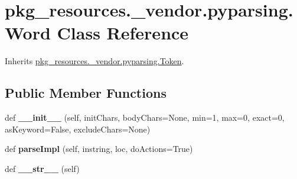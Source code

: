 \hypertarget{classpkg__resources_1_1__vendor_1_1pyparsing_1_1_word}{}\section{pkg\+\_\+resources.\+\_\+vendor.\+pyparsing.\+Word Class Reference}
\label{classpkg__resources_1_1__vendor_1_1pyparsing_1_1_word}


Inherits \hyperlink{classpkg__resources_1_1__vendor_1_1pyparsing_1_1_token}{pkg\+\_\+resources.\+\_\+vendor.\+pyparsing.\+Token}.

\subsection*{Public Member Functions}
\begin{DoxyCompactItemize}
\item 
\mbox{\label{classpkg__resources_1_1__vendor_1_1pyparsing_1_1_word_a8c9a97aa6e7e90fc6a88fc0b1c7b1aac}} 
def {\bfseries \+\_\+\+\_\+init\+\_\+\+\_\+} (self, init\+Chars, body\+Chars=None, min=1, max=0, exact=0, as\+Keyword=False, exclude\+Chars=None)
\item 
\mbox{\label{classpkg__resources_1_1__vendor_1_1pyparsing_1_1_word_a137cd4ad1af8ef50e1a333fa302df019}} 
def {\bfseries parse\+Impl} (self, instring, loc, do\+Actions=True)
\item 
\mbox{\label{classpkg__resources_1_1__vendor_1_1pyparsing_1_1_word_a827a7c69cae67dfb31749169705793d6}} 
def {\bfseries \+\_\+\+\_\+str\+\_\+\+\_\+} (self)
\end{DoxyCompactItemize}

